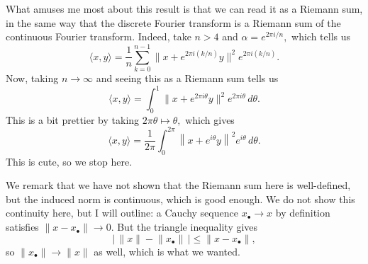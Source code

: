 What amuses me most about this result is that we can read it as a Riemann sum, in the same way that the discrete Fourier transform is a Riemann sum of the continuous Fourier transform. Indeed, take $n>4$ and $\alpha=e^{2\pi i/n},$ which tells us
\[\langle x,y\rangle=\frac1n\sum_{k=0}^{n-1}\big\lVert x+e^{2\pi i(k/n)}y\big\rVert^2e^{2\pi i(k/n)}.\]
Now, taking $n\to\infty$ and seeing this as a Riemann sum tells us
\[\langle x,y\rangle=\int_0^1\big\lVert x+e^{2\pi i\theta}y\big\rVert^2e^{2\pi i\theta}\,d\theta.\]
This is a bit prettier by taking $2\pi\theta\mapsto\theta,$ which gives
\[\langle x,y\rangle=\frac1{2\pi}\int_0^{2\pi}\left\lVert x+e^{i\theta}y\right\rVert^2e^{i\theta}\,d\theta.\]
This is cute, so we stop here.

We remark that we have not shown that the Riemann sum here is well-defined, but the induced norm is continuous, which is good enough. We do not show this continuity here, but I will outline: a Cauchy sequence $x_\bullet\to x$ by definition satisfies $\lVert x-x_\bullet\rVert\to0.$ But the triangle inequality gives
\[\left|\,\lVert x\rVert-\lVert x_\bullet\rVert\,\right|\le\lVert x-x_\bullet\rVert,\]
so $\lVert x_\bullet\rVert\to\lVert x\rVert$ as well, which is what we wanted.